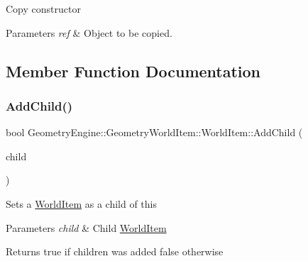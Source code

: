 Copy constructor 
\begin{DoxyParams}{Parameters}
{\em ref} & Object to be copied. \\
\hline
\end{DoxyParams}


\subsection{Member Function Documentation}
\mbox{\label{class_geometry_engine_1_1_geometry_world_item_1_1_world_item_aa66f97360029dfc268a16a9f248be74a}} 
\subsubsection{\texorpdfstring{AddChild()}{AddChild()}}
{\footnotesize\ttfamily bool Geometry\+Engine\+::\+Geometry\+World\+Item\+::\+World\+Item\+::\+Add\+Child (\begin{DoxyParamCaption}\item[{\mbox{\hyperlink{class_geometry_engine_1_1_geometry_world_item_1_1_world_item}{World\+Item}} $\ast$}]{child }\end{DoxyParamCaption})}

Sets a \mbox{\hyperlink{class_geometry_engine_1_1_geometry_world_item_1_1_world_item}{World\+Item}} as a child of this 
\begin{DoxyParams}{Parameters}
{\em child} & Child \mbox{\hyperlink{class_geometry_engine_1_1_geometry_world_item_1_1_world_item}{World\+Item}} \\
\hline
\end{DoxyParams}
\begin{DoxyReturn}{Returns}
true if children was added false otherwise 
\end{DoxyReturn}
\mbox{\label{class_geometry_engine_1_1_geometry_world_item_1_1_world_item_a15405881b3e3de9f417484160ab5c735}} 

